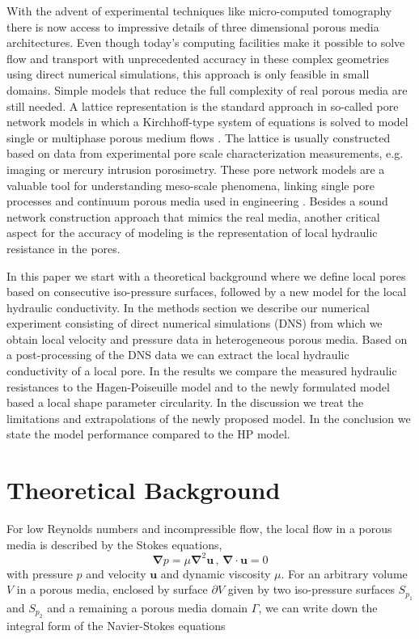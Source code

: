\documentclass[draft]{agujournal2019}
\begin{document}
With the advent of experimental techniques like micro-computed tomography there is now access to impressive details of three dimensional porous media architectures. Even though today’s computing facilities make it possible to solve flow and transport with unprecedented accuracy in these complex geometries using direct numerical simulations, this approach is only feasible in small domains. Simple models that reduce the full complexity of real porous media are still needed. A lattice representation is the standard approach in so-called pore network models in which a Kirchhoff-type system of equations is solved to model single or multiphase porous medium flows . The lattice is usually constructed based on data from experimental pore scale characterization measurements, e.g. imaging or mercury intrusion porosimetry. These pore network models are a valuable tool for understanding meso-scale phenomena, linking single pore processes and continuum porous media used in engineering . Besides a sound network construction approach that mimics the real media, another critical aspect for the accuracy of modeling is the representation of local hydraulic resistance in the pores. 


In this paper we start with a theoretical background where we define local pores based on consecutive iso-pressure surfaces, followed by a new model for the local hydraulic conductivity. In the methods section we describe our numerical experiment consisting of direct numerical simulations (DNS) from which we obtain local velocity and pressure data in heterogeneous porous media. Based on a post-processing of the DNS data we can extract the local hydraulic conductivity of a local pore. In the results we compare the measured hydraulic resistances to the Hagen-Poiseuille model and to the newly formulated model based a local shape parameter circularity. In the discussion we treat the limitations and extrapolations of the newly proposed model. In the conclusion we state the model performance compared to the HP model.



\section{Theoretical Background}

For low Reynolds numbers and incompressible flow, the local flow in a porous media is described by the Stokes equations,
\begin{equation}
	\mathbf{\nabla} p =  \mu\mathbf{\nabla}^2 \mathbf{u}\,,\,\mathbf{\nabla}\cdot\mathbf{u}=0\label{eq:stokes_local}
	\end{equation}
with pressure $p$ and velocity $\mathbf{u}$ and dynamic viscosity $\mu$. For an arbitrary volume $V$ in a porous media, enclosed by surface $\partial V$ given by two iso-pressure surfaces $S_{p_1}$ and $S_{p_2}$ and a remaining a porous media domain $\Gamma$, we can write down the integral form of the Navier-Stokes equations
{}
\end{document}

